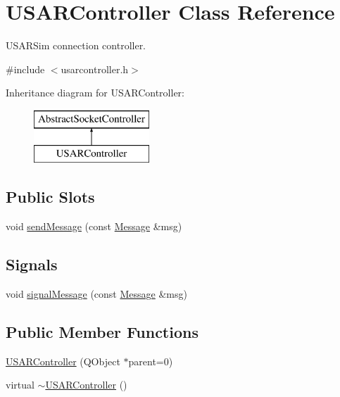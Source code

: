 \hypertarget{classUSARController}{
\section{USARController Class Reference}
\label{classUSARController}
}


USARSim connection controller.  




{\ttfamily \#include $<$usarcontroller.h$>$}

Inheritance diagram for USARController:\begin{figure}[H]
\begin{center}
\leavevmode
\includegraphics[height=2.000000cm]{classUSARController}
\end{center}
\end{figure}
\subsection*{Public Slots}
\begin{DoxyCompactItemize}
\item 
void \hyperlink{classUSARController_a2becbd888b35304051cc2095570b3b18}{sendMessage} (const \hyperlink{classMessage}{Message} \&msg)
\end{DoxyCompactItemize}
\subsection*{Signals}
\begin{DoxyCompactItemize}
\item 
void \hyperlink{classUSARController_a42e81ce338bb7799c42ca968369aaf7b}{signalMessage} (const \hyperlink{classMessage}{Message} \&msg)
\end{DoxyCompactItemize}
\subsection*{Public Member Functions}
\begin{DoxyCompactItemize}
\item 
\hyperlink{classUSARController_ac5c82f3819f4a34b00cfcc63547ab2a6}{USARController} (QObject $\ast$parent=0)
\item 
virtual \hyperlink{classUSARController_a450f87dd480cc0c0895255fa4bebf869}{$\sim$USARController} ()
\end{DoxyCompactItemize}

